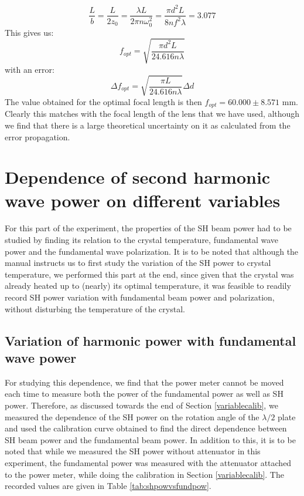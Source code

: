 \begin{itemize}
$$\dfrac{L}{b}=\dfrac{L}{2z_{0}}=\dfrac{\lambda L}{2\pi n \omega_{0}^{2}}=\dfrac{\pi d^{2} L}{8nf^{2}\lambda}=3.077
$$
This gives us: 
\begin{equation}
f_{opt}=\sqrt{\dfrac{\pi d^{2}L}{24.616n\lambda}}
\end{equation}
with an error: 
\begin{equation}
\Delta f_{opt}=\sqrt{\dfrac{\pi L}{24.616n\lambda}}\Delta d
\end{equation}
The value obtained for the optimal focal length is then $f_{opt}=60.000\pm 8.571$ mm. Clearly this matches with the focal length of the lens that we have used, although we find that there is a large theoretical uncertainty on it as calculated from the error propagation.
\end{itemize}

\section{Dependence of second harmonic wave power on different variables}
For this part of the experiment, the properties of the SH beam power had to be studied by finding its relation to the crystal temperature, fundamental wave power and the fundamental wave polarization. It is to be noted that although the manual instructs us to first study the variation of the SH power to crystal temperature, we performed this part at the end, since given that the crystal was already heated up to (nearly) its optimal temperature, it was feasible to readily record SH power variation with fundamental beam power and polarization, without disturbing the temperature of the crystal. 

\subsection{Variation of harmonic power with fundamental wave power} 
For studying this dependence, we find that the power meter cannot be moved each time to measure both the power of the fundamental power as well as SH power. Therefore, as discussed towards the end of Section \ref{variablecalib}, we measured the dependence of the SH power on the rotation angle of the $\lambda /2$ plate and used the calibration curve obtained to find the direct dependence between SH beam power and the fundamental beam power. In addition to this, it is to be noted that while we measured the SH power without attenuator in this experiment, the fundamental power was measured with the attenuator attached to the power meter, while doing the calibration in Section \ref{variablecalib}. The recorded values are given in Table \ref{tab:shpowvsfundpow}.

